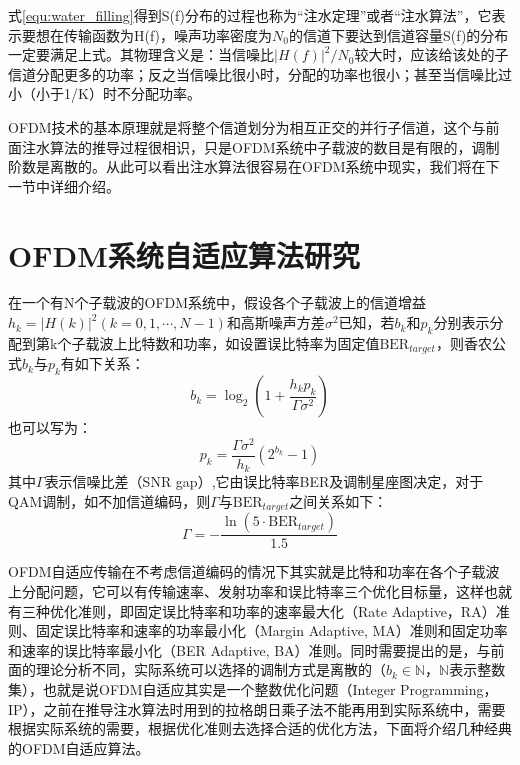 式\ref{equ:water_filling}得到S(f)分布的过程也称为“注水定理”或者“注水算法”，它表示要想在传输函数为H(f)，噪声功率密度为$N_0$的信道下要达到信道容量S(f)的分布一定要满足上式。其物理含义是：当信噪比$|H(f)|^2/N_0$较大时，应该给该处的子信道分配更多的功率；反之当信噪比很小时，分配的功率也很小；甚至当信噪比过小（小于1/K）时不分配功率。

OFDM技术的基本原理就是将整个信道划分为相互正交的并行子信道，这个与前面注水算法的推导过程很相识，只是OFDM系统中子载波的数目是有限的，调制阶数是离散的。从此可以看出注水算法很容易在OFDM系统中现实，我们将在下一节中详细介绍。
\section{OFDM系统自适应算法研究}
在一个有N个子载波的OFDM系统中，假设各个子载波上的信道增益$h_k=|H(k)|^2(k=0,1,\cdots,N-1)$和高斯噪声方差$\sigma^2$已知，若$b_k$和$p_k$分别表示分配到第k个子载波上比特数和功率，如设置误比特率为固定值$\text{BER}_{target}$，则香农公式$b_k$与$p_k$有如下关系：
\begin{equation}
b_k = \log_2(1+\frac{h_kp_k}{\Gamma\sigma^2})
\end{equation}
也可以写为：
\begin{equation}
p_k = \frac{\Gamma\sigma^2}{h_k}(2^{b_k}-1)
\end{equation}
其中$\Gamma$表示信噪比差（SNR gap）,它由误比特率BER及调制星座图决定，对于QAM调制，如不加信道编码，则$\Gamma$与$\text{BER}_{target}$之间关系如下\cite{余官定2005ofdm}：
\begin{equation}
\Gamma = -\frac{\ln(5\cdot\text{BER}_{target})}{1.5}
\end{equation}

OFDM自适应传输在不考虑信道编码的情况下其实就是比特和功率在各个子载波上分配问题，它可以有传输速率、发射功率和误比特率三个优化目标量，这样也就有三种优化准则，即固定误比特率和功率的速率最大化（Rate Adaptive，RA）准则、固定误比特率和速率的功率最小化（Margin Adaptive, MA）准则和固定功率和速率的误比特率最小化（BER Adaptive, BA）准则。同时需要提出的是，与前面的理论分析不同，实际系统可以选择的调制方式是离散的（$b_k \in \mathbb{N}$，$\mathbb{N}$表示整数集），也就是说OFDM自适应其实是一个整数优化问题（Integer Programming，IP），之前在推导注水算法时用到的拉格朗日乘子法不能再用到实际系统中，需要根据实际系统的需要，根据优化准则去选择合适的优化方法，下面将介绍几种经典的OFDM自适应算法。
